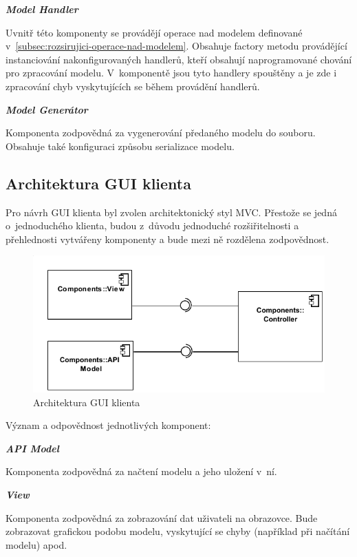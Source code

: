 \documentclass[11pt,twoside,a4paper]{book}
\begin{document}
\textbf{\textit{Model Handler}}

Uvnitř této komponenty se provádějí operace nad modelem definované
v~\ref{subsec:rozsirujici-operace-nad-modelem}.
Obsahuje factory metodu provádějící instanciování nakonfigurovaných handlerů,
kteří obsahují naprogramované chování pro zpracování modelu. V~komponentě jsou
tyto handlery spouštěny a je zde i zpracování chyb vyskytujících se během
provádění handlerů.

\textbf{\textit{Model Generátor}}

Komponenta zodpovědná za vygenerování předaného modelu do souboru. Obsahuje také
konfiguraci způsobu serializace modelu.

\subsection{Architektura GUI klienta}
\label{subsec:architejtura-gui}

Pro návrh GUI klienta byl zvolen architektonický styl MVC.
Přestože se jedná o~jednoduchého klienta, budou z~důvodu jednoduché
rozšiřitelnosti a přehlednosti vytvářeny komponenty a bude mezi ně rozdělena
zodpovědnost.

\begin{figure}[h]
\begin{center}
\includegraphics[width=13cm]{images-pdf/GUIClient.pdf}
\caption{Architektura GUI klienta}
\label{fig:architektura-gui}
\end{center}
\end{figure}

Význam a odpovědnost jednotlivých komponent:

\textbf{\textit{API Model}}

Komponenta zodpovědná za načtení modelu a jeho uložení v~ní.

\textbf{\textit{View}}

Komponenta zodpovědná za zobrazování dat uživateli na obrazovce. Bude zobrazovat
grafickou podobu modelu, vyskytující se chyby (například při načítání modelu) apod.
\end{document}
